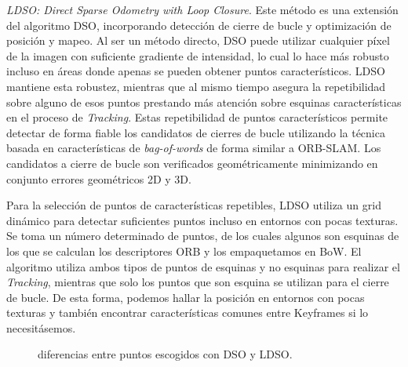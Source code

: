 \clearpage

\textit{LDSO: Direct Sparse Odometry with Loop Closure}. Este método es una extensión del algoritmo DSO, incorporando detección de cierre de bucle y optimización de posición y mapeo. Al ser un método directo, DSO puede utilizar cualquier píxel de la imagen con suficiente gradiente de intensidad, lo cual lo hace más robusto incluso en áreas donde apenas se pueden obtener puntos característicos. LDSO mantiene esta robustez, mientras que al mismo tiempo asegura la repetibilidad  sobre alguno de esos puntos prestando más atención sobre esquinas características en el proceso de \textit{Tracking}. Estas repetibilidad de puntos característicos permite detectar de forma fiable los candidatos de cierres de bucle utilizando la técnica basada en características de \textit{bag-of-words} de forma similar a ORB-SLAM. 
Los candidatos a cierre de bucle son verificados geométricamente minimizando en conjunto errores geométricos 2D y 3D.

Para la selección de puntos de características repetibles, LDSO utiliza un grid dinámico para detectar suficientes puntos incluso en entornos con pocas texturas. Se toma un número determinado de puntos, de los cuales algunos son esquinas de los que se calculan los descriptores ORB y los empaquetamos en BoW. El algoritmo  utiliza ambos tipos de puntos de esquinas y no esquinas para realizar el \textit{Tracking}, mientras que solo los puntos que son esquina se utilizan para el cierre de bucle. 
De esta forma, podemos hallar la posición en entornos con pocas texturas y también encontrar características comunes entre Keyframes si lo necesitásemos.

\begin{figure}[H]
\begin{center}
\end{center}
\caption{diferencias entre puntos escogidos con DSO y LDSO.}
\end{figure}





